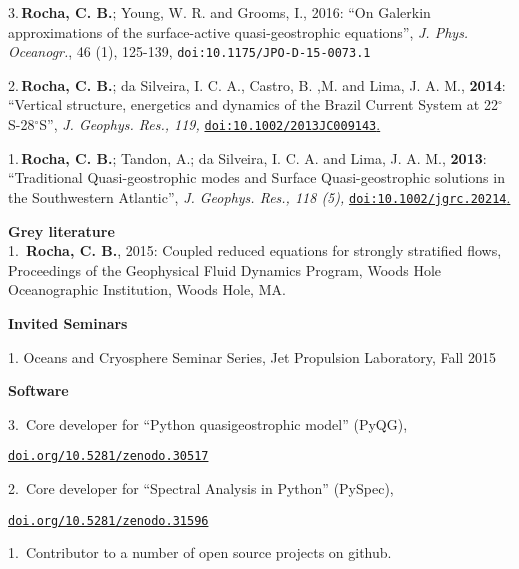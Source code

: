 \documentclass[a4paper,11pt,final]{memoir}
\newcommand{\Sep}{\vspace{1.25em}}
\newcommand{\SmallSep}{\vspace{0.5em}}
\newcommand{\CVSection}[1]
    {\Large\textbf{#1}\par
    \SmallSep\normalsize\normalfont}
\newcommand{\CVItem}[1]
    {\textbf{\color{NavyBlue} #1}}
\begin{document}
\SmallSep

3.\,\textbf{Rocha, C. B.};  Young, W. R. and Grooms, I., 2016: ``On Galerkin approximations of the surface-active quasi-geostrophic equations'', \textit{J. Phys. Oceanogr.}, 46 (1), 125-139, \texttt{doi:10.1175/JPO-D-15-0073.1}

\SmallSep

2.\,\textbf{Rocha, C. B.};  da Silveira, I. C. A., Castro, B. ,M. and Lima, J. A. M., \textbf{2014}: ``Vertical structure, energetics and dynamics of the Brazil Current System at 22$^\circ$S-28$^\circ$S'', \textit{ J. Geophys. Res., 119,} \href{http://onlinelibrary.wiley.com/doi/10.1002/2013JC009143/abstract}{\texttt{doi:10.1002/2013JC009143}.}

\SmallSep

1.\,\textbf{Rocha, C. B.}; Tandon, A.; da Silveira, I. C. A. and Lima, J. A. M., \textbf{2013}: ``Traditional Quasi-geostrophic modes and Surface Quasi-geostrophic solutions in the Southwestern Atlantic'', \textit{ J. Geophys. Res., 118 (5),} \href{http://dx.doi.org/10.1002/jgrc.20214}{\texttt{doi:10.1002/jgrc.20214}.}

\SmallSep

\clearpage
\framebreak
\framebreak


\CVItem{Grey literature}\\

1.\, \textbf{Rocha, C. B.}, 2015: Coupled reduced equations for strongly stratified flows,  Proceedings of the Geophysical Fluid Dynamics Program,  Woods Hole Oceanographic Institution, Woods Hole, MA.

\Sep

\CVSection{Invited Seminars}

1. Oceans and Cryosphere Seminar Series, Jet Propulsion Laboratory, Fall 2015

\Sep

\CVSection{Software}

3.\, Core developer for ``Python quasigeostrophic model'' (PyQG),

\href{http://dx.doi.org/10.5281/zenodo.30517}{\texttt{doi.org/10.5281/zenodo.30517}}

\SmallSep

2.\, Core developer for ``Spectral Analysis in Python'' (PySpec),

\href{http://dx.doi.org/10.5281/zenodo.31596}{\texttt{doi.org/10.5281/zenodo.31596}}

1.\, Contributor to a number of open source projects on github.
\end{document}
